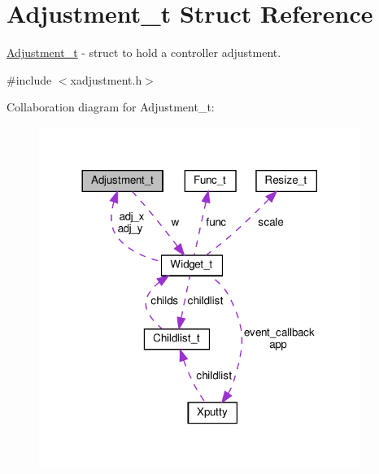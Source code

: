 \hypertarget{structAdjustment__t}{}\section{Adjustment\+\_\+t Struct Reference}
\label{structAdjustment__t}


\hyperlink{structAdjustment__t}{Adjustment\+\_\+t} -\/ struct to hold a controller adjustment.  




{\ttfamily \#include $<$xadjustment.\+h$>$}



Collaboration diagram for Adjustment\+\_\+t\+:
\nopagebreak
\begin{figure}[H]
\begin{center}
\leavevmode
\includegraphics[width=296pt]{structAdjustment__t__coll__graph}
\end{center}
\end{figure}
